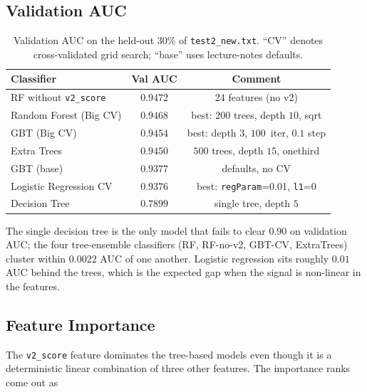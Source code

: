 \documentclass[12pt]{article}
\begin{document}
	\newpage
	\subsection{Validation AUC}

	\begin{table}[H]
		\centering
		\caption{Validation AUC on the held-out 30\% of \texttt{test2\_new.txt}. ``CV'' denotes cross-validated grid search; ``base'' uses lecture-notes defaults.}\label{tab:val-auc}
		\begin{tabular}{lcc}
			\toprule
			Classifier & Val AUC & Comment \\
			\midrule
			RF without \texttt{v2\_score}    & $\mathbf{0.9472}$ & 24 features (no v2)  \\
			Random Forest (Big CV)          & $0.9468$ & best: $200$ trees, depth $10$, sqrt \\
			GBT (Big CV)                    & $0.9454$ & best: depth $3$, $100$~iter, $0.1$ step \\
			Extra Trees                     & $0.9450$ & $500$ trees, depth $15$, onethird \\
			GBT (base)                      & $0.9377$ & defaults, no CV \\
			Logistic Regression CV          & $0.9376$ & best: \texttt{regParam}=0.01, \texttt{l1}=0 \\
			Decision Tree                   & $0.7899$ & single tree, depth $5$ \\
			\bottomrule
		\end{tabular}
	\end{table}

	The single decision tree is the only model that fails to clear $0.90$ on validation AUC; the four tree-ensemble classifiers (RF, RF-no-v2, GBT-CV, ExtraTrees) cluster within $0.0022$ AUC of one another. Logistic regression sits roughly $0.01$ AUC behind the trees, which is the expected gap when the signal is non-linear in the features.

	\newpage
	\subsection{Feature Importance}

	The \texttt{v2\_score} feature dominates the tree-based models even though it is a deterministic linear combination of three other features. The importance ranks come out as
\end{document}
